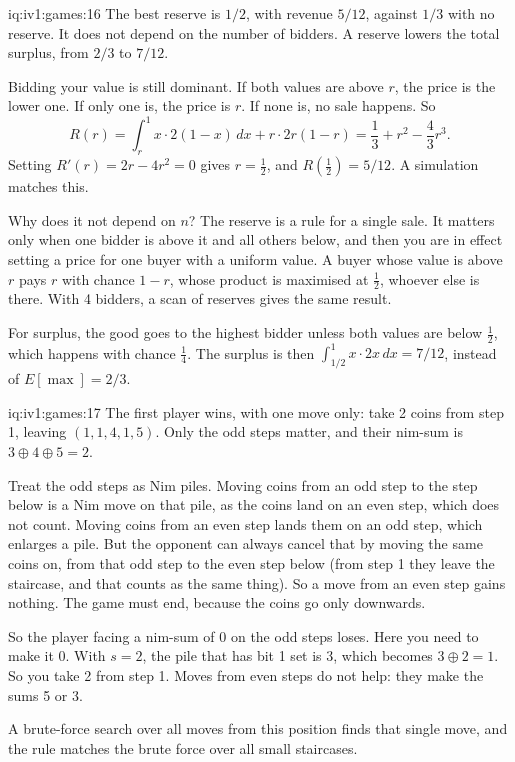 \begin{solution}{iq:iv1:games:16}
The best reserve is $1/2$, with revenue $5/12$, against $1/3$ with no reserve. It does not depend on the number of bidders. A reserve lowers the total surplus, from $2/3$ to $7/12$.

Bidding your value is still dominant. If both values are above $r$, the price is the lower one. If only one is, the price is $r$. If none is, no sale happens. So
\[
R(r) = \int_r^1 x \cdot 2(1 - x)\,dx + r \cdot 2r(1 - r) = \frac13 + r^2 - \frac43 r^3.
\]
Setting $R'(r) = 2r - 4r^2 = 0$ gives $r = \tfrac12$, and $R(\tfrac12) = 5/12$. A simulation matches this.

Why does it not depend on $n$? The reserve is a rule for a single sale. It matters only when one bidder is above it and all others below, and then you are in effect setting a price for one buyer with a uniform value. A buyer whose value is above $r$ pays $r$ with chance $1 - r$, whose product is maximised at $\tfrac12$, whoever else is there. With 4 bidders, a scan of reserves gives the same result.

For surplus, the good goes to the highest bidder unless both values are below $\tfrac12$, which happens with chance $\tfrac14$. The surplus is then $\int_{1/2}^1 x \cdot 2x\,dx = 7/12$, instead of $E[\max] = 2/3$.

\end{solution}

\begin{solution}{iq:iv1:games:17}
The first player wins, with one move only: take 2 coins from step 1, leaving $(1, 1, 4, 1, 5)$. Only the odd steps matter, and their nim-sum is $3 \oplus 4 \oplus 5 = 2$.

Treat the odd steps as Nim piles. Moving coins from an odd step to the step below is a Nim move on that pile, as the coins land on an even step, which does not count. Moving coins from an even step lands them on an odd step, which enlarges a pile. But the opponent can always cancel that by moving the same coins on, from that odd step to the even step below (from step 1 they leave the staircase, and that counts as the same thing). So a move from an even step gains nothing. The game must end, because the coins go only downwards.

So the player facing a nim-sum of 0 on the odd steps loses. Here you need to make it 0. With $s = 2$, the pile that has bit 1 set is 3, which becomes $3 \oplus 2 = 1$. So you take 2 from step 1. Moves from even steps do not help: they make the sums 5 or 3.

A brute-force search over all moves from this position finds that single move, and the rule matches the brute force over all small staircases.

\end{solution}

